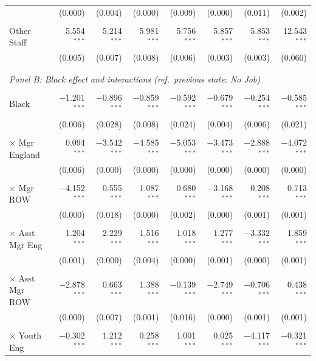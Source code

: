 \begin{table}[!h]
{\begin{threeparttable}
\begin{tabular}{lrrrrrrr}
  & (0.000) & (0.004) & (0.000) & (0.009) & (0.000) & (0.011) & (0.002) \\
 & & & & & & & \\
Other Staff & 5.554$^{***}$ & 5.214$^{***}$ & 5.981$^{***}$ & 5.756$^{***}$ & 5.857$^{***}$ & 5.853$^{***}$ & 12.543$^{***}$ \\
  & (0.005) & (0.007) & (0.008) & (0.006) & (0.003) & (0.003) & (0.060) \\
 & & & & & & & \\
\hline \\[-1.8ex]
\multicolumn{8}{l}{\textit{Panel B: Black effect and interactions (ref.\ previous state: No Job)}} \\
\\[-1.8ex]
Black & $-$1.201$^{***}$ & $-$0.896$^{***}$ & $-$0.859$^{***}$ & $-$0.592$^{***}$ & $-$0.679$^{***}$ & $-$0.254$^{***}$ & $-$0.585$^{***}$ \\
  & (0.006) & (0.028) & (0.008) & (0.024) & (0.004) & (0.006) & (0.021) \\
 & & & & & & & \\
\quad $\times$ Mgr England & 0.094$^{***}$ & $-$3.542$^{***}$ & $-$4.585$^{***}$ & $-$5.053$^{***}$ & $-$3.473$^{***}$ & $-$2.888$^{***}$ & $-$4.072$^{***}$ \\
  & (0.006) & (0.000) & (0.000) & (0.000) & (0.000) & (0.000) & (0.000) \\
 & & & & & & & \\
\quad $\times$ Mgr ROW & $-$4.152$^{***}$ & 0.555$^{***}$ & 1.087$^{***}$ & 0.680$^{***}$ & $-$3.168$^{***}$ & 0.208$^{***}$ & 0.713$^{***}$ \\
  & (0.000) & (0.018) & (0.000) & (0.002) & (0.000) & (0.001) & (0.001) \\
 & & & & & & & \\
\quad $\times$ Asst Mgr Eng & 1.204$^{***}$ & 2.229$^{***}$ & 1.516$^{***}$ & 1.018$^{***}$ & 1.277$^{***}$ & $-$3.332$^{***}$ & 1.859$^{***}$ \\
  & (0.001) & (0.000) & (0.004) & (0.000) & (0.001) & (0.000) & (0.001) \\
 & & & & & & & \\
\quad $\times$ Asst Mgr ROW & $-$2.878$^{***}$ & 0.663$^{***}$ & 1.388$^{***}$ & $-$0.139$^{***}$ & $-$2.749$^{***}$ & $-$0.706$^{***}$ & 0.438$^{***}$ \\
  & (0.000) & (0.007) & (0.001) & (0.016) & (0.000) & (0.001) & (0.001) \\
 & & & & & & & \\
\quad $\times$ Youth Eng & $-$0.302$^{***}$ & 1.212$^{***}$ & 0.258$^{***}$ & 1.001$^{***}$ & 0.025$^{***}$ & $-$4.117$^{***}$ & $-$0.321$^{***}$ \\

\end{tabular}
\end{threeparttable}}
\end{table}
